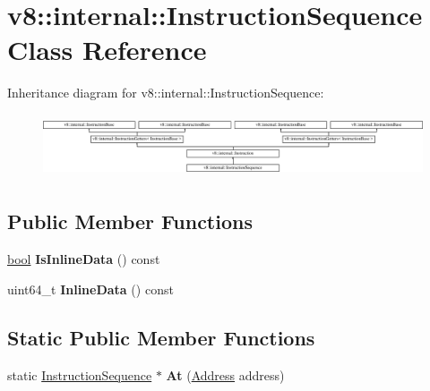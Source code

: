 \hypertarget{classv8_1_1internal_1_1InstructionSequence}{}\section{v8\+:\+:internal\+:\+:Instruction\+Sequence Class Reference}
\label{classv8_1_1internal_1_1InstructionSequence}
Inheritance diagram for v8\+:\+:internal\+:\+:Instruction\+Sequence\+:\begin{figure}[H]
\begin{center}
\leavevmode
\includegraphics[height=1.891892cm]{classv8_1_1internal_1_1InstructionSequence}
\end{center}
\end{figure}
\subsection*{Public Member Functions}
\begin{DoxyCompactItemize}
\item 
\mbox{\label{classv8_1_1internal_1_1InstructionSequence_a58ce0335c1d24125285970d66fb8a45e}} 
\mbox{\hyperlink{classbool}{bool}} {\bfseries Is\+Inline\+Data} () const
\item 
\mbox{\label{classv8_1_1internal_1_1InstructionSequence_a4b83c7f17ca394d8d149cdddf696f739}} 
uint64\+\_\+t {\bfseries Inline\+Data} () const
\end{DoxyCompactItemize}
\subsection*{Static Public Member Functions}
\begin{DoxyCompactItemize}
\item 
\mbox{\label{classv8_1_1internal_1_1InstructionSequence_aa17d0fabb0be85c86b49288b7159fdd5}} 
static \mbox{\hyperlink{classv8_1_1internal_1_1InstructionSequence}{Instruction\+Sequence}} $\ast$ {\bfseries At} (\mbox{\hyperlink{classuintptr__t}{Address}} address)
\end{DoxyCompactItemize}

